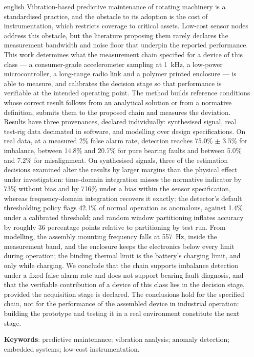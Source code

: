 
\begin{resumo}[Abstract]
\begin{otherlanguage*}{english}
Vibration-based predictive maintenance of rotating machinery is a standardised practice,
and the obstacle to its adoption is the cost of instrumentation, which restricts coverage
to critical assets. Low-cost sensor nodes address this obstacle, but the literature
proposing them rarely declares the measurement bandwidth and noise floor that underpin the
reported performance. This work determines what the measurement chain specified for a
device of this class --- a consumer-grade accelerometer sampling at 1~kHz, a low-power
microcontroller, a long-range radio link and a polymer printed enclosure --- is able to
measure, and calibrates the decision stage so that performance is verifiable at the
intended operating point. The method builds reference conditions whose correct result
follows from an analytical solution or from a normative definition, submits them to the
proposed chain and measures the deviation. Results have three provenances, declared
individually: synthesised signal, real test-rig data decimated in software, and modelling
over design specifications. On real data, at a measured 2\% false alarm rate, detection reaches
75.0\% $\pm$ 3.5\% for imbalance, between 14.8\% and 20.7\% for pure bearing faults and
between 5.0\% and 7.2\% for misalignment. On synthesised signals, three of the estimation
decisions examined alter the results by larger margins than the physical effect under
investigation: time-domain integration misses the normative indicator by 73\% without bias
and by 716\% under a bias within the sensor specification, whereas frequency-domain
integration recovers it exactly; the detector's default thresholding policy flags 42.1\% of
normal operation as anomalous, against 1.4\% under a calibrated threshold; and random
window partitioning inflates accuracy by roughly 36 percentage points relative to
partitioning by test run. From modelling, the assembly mounting frequency falls at 557~Hz,
inside the measurement band, and the enclosure keeps the electronics below every limit
during operation; the binding thermal limit is the battery's charging limit, and only while
charging. We conclude that the chain supports imbalance detection under
a fixed false alarm rate and does not support bearing fault diagnosis, and that the
verifiable contribution of a device of this class lies in the decision stage, provided the
acquisition stage is declared. The conclusions hold for the specified chain, not for the
performance of the assembled device in industrial operation: building the prototype and
testing it in a real environment constitute the next stage.

\vspace{\onelineskip}
\noindent
\textbf{Keywords}: predictive maintenance; vibration analysis; anomaly detection;
embedded systems; low-cost instrumentation.
\end{otherlanguage*}
\end{resumo}
